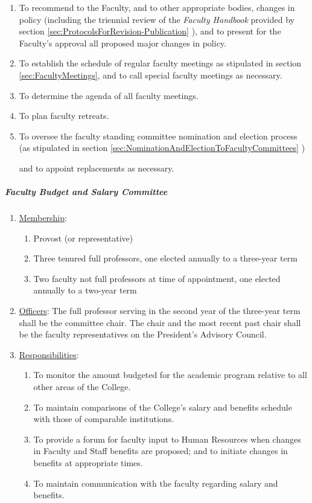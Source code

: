 \begin{enumerate}[label=\alph*)]
{\begin{enumerate}[label=\arabic*)]
								\item{To recommend to the Faculty, and to other appropriate bodies, changes in policy (including the triennial review of the \emph{Faculty Handbook} provided by
									section
									\ref{sec:ProtocolsForRevision-Publication}
									), and to present for the Faculty's approval all proposed major changes in policy.}
								\item{To establish the schedule of regular faculty meetings as stipulated in
									section
									\ref{sec:FacultyMeetings}, and to call special faculty meetings as necessary.}
								\item{To determine the agenda of all faculty meetings.}
								\item{To plan faculty retreats.}
								\item{To oversee the faculty standing committee nomination and election process (as stipulated in
									section
									\ref{sec:NominationAndElectionToFacultyCommittees}
									)

									and to appoint replacements as necessary.}
							\end{enumerate}
						}
					\end{enumerate}
				\subparagraph{Faculty Budget and Salary Committee}
					\begin{enumerate}[label=\alph*)]
						\item{\underline{Membership}:
							\begin{enumerate}[label=\arabic*)]
								\item{Provost (or representative)}
								\item{Three tenured full professors, one elected annually to a three-year term}
								\item{Two faculty not full professors at time of appointment, one elected annually to a two-year term}
							\end{enumerate}
						}
						\item{\underline{Officers}:
							The full professor serving in the second year of the three-year term shall be the committee chair.  The chair and the most recent past chair shall be the faculty representatives on the President's Advisory Council.
						}
						\item{\underline{Responsibilities}:
							\begin{enumerate}[label=\arabic*)]
								\item{To monitor the amount budgeted for the academic program relative to all other areas of the College.}
								\item{To maintain comparisons of the College's salary and benefits schedule with those of comparable institutions.}
								\item{To provide a forum for faculty input to Human Resources when changes in Faculty and Staff benefits are proposed; and to initiate changes in benefits at appropriate times.}
								\item{To maintain communication with the faculty regarding salary and benefits.}
							\end{enumerate}
						}
					\end{enumerate}
